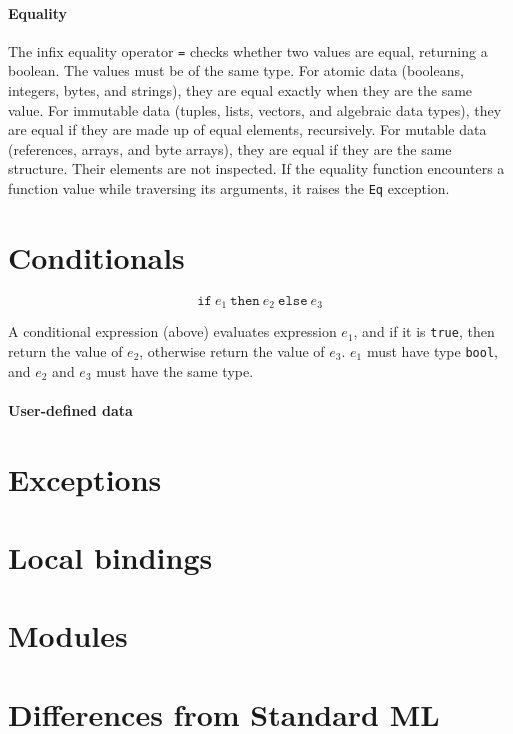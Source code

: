 \documentclass[12pt,a4paper]{book}
\begin{document}
\paragraph{Equality}

The infix equality operator \texttt{=} checks whether two values are equal, returning a boolean. The values must be of the same type. For atomic data (booleans, integers, bytes, and strings), they are equal exactly when they are the same value. For immutable data (tuples, lists, vectors, and algebraic data types), they are equal if they are made up of equal elements, recursively. For mutable data (references, arrays, and byte arrays), they are equal if they are the same structure. Their elements are not inspected.
If the equality function encounters a function value while traversing its arguments, it raises the \texttt{Eq} exception.


\section{Conditionals}
%
\[\texttt{if}\ e_1\ \texttt{then}\ e_2\ \texttt{else}\ e_3\]

A conditional expression (above) evaluates expression $e_1$, and if it is \texttt{true}, then return the value of $e_2$, otherwise return the value of $e_3$. $e_1$ must have type \texttt{bool}, and $e_2$ and $e_3$ must have the same type.


\paragraph{User-defined data}

\section{Exceptions}

\section{Local bindings}

\section{Modules}

\section{Differences from Standard ML}
\end{document}
